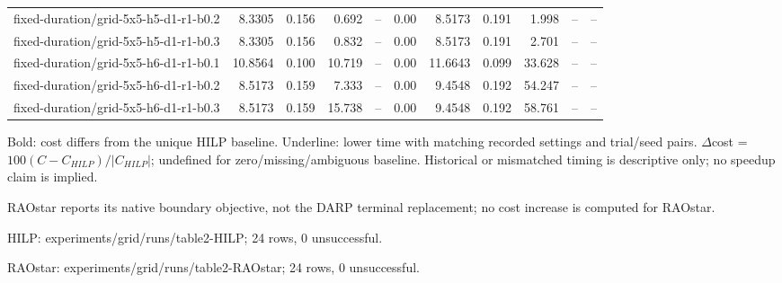\documentclass[10pt]{article}
\begin{document}
\begin{tabular}{p{65mm}rrrrrrrrrr}
fixed-\allowbreak duration/\allowbreak grid-\allowbreak 5x5-\allowbreak h5-\allowbreak d1-\allowbreak r1-\allowbreak b0.2 & 8.3305 & 0.156 & 0.692 & -- & 0.00 & 8.5173 & 0.191 & 1.998 & -- & -- \\
fixed-\allowbreak duration/\allowbreak grid-\allowbreak 5x5-\allowbreak h5-\allowbreak d1-\allowbreak r1-\allowbreak b0.3 & 8.3305 & 0.156 & 0.832 & -- & 0.00 & 8.5173 & 0.191 & 2.701 & -- & -- \\
fixed-\allowbreak duration/\allowbreak grid-\allowbreak 5x5-\allowbreak h6-\allowbreak d1-\allowbreak r1-\allowbreak b0.1 & 10.8564 & 0.100 & 10.719 & -- & 0.00 & 11.6643 & 0.099 & 33.628 & -- & -- \\
fixed-\allowbreak duration/\allowbreak grid-\allowbreak 5x5-\allowbreak h6-\allowbreak d1-\allowbreak r1-\allowbreak b0.2 & 8.5173 & 0.159 & 7.333 & -- & 0.00 & 9.4548 & 0.192 & 54.247 & -- & -- \\
fixed-\allowbreak duration/\allowbreak grid-\allowbreak 5x5-\allowbreak h6-\allowbreak d1-\allowbreak r1-\allowbreak b0.3 & 8.5173 & 0.159 & 15.738 & -- & 0.00 & 9.4548 & 0.192 & 58.761 & -- & -- \\
\bottomrule\end{tabular}\par
\medskip\footnotesize
Bold: cost differs from the unique HILP baseline. Underline: lower time with matching recorded settings and trial/seed pairs. $\Delta$cost = $100(C-C_{HILP})/|C_{HILP}|$; undefined for zero/missing/ambiguous baseline. Historical or mismatched timing is descriptive only; no speedup claim is implied.\par
RAOstar reports its native boundary objective, not the DARP terminal replacement; no cost increase is computed for RAOstar.\par
HILP: experiments/grid/runs/table2-HILP; 24 rows, 0 unsuccessful.\par
RAOstar: experiments/grid/runs/table2-RAOstar; 24 rows, 0 unsuccessful.\par
\end{document}
